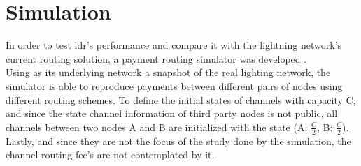 \section{Simulation}

In order to test \acrshort{ldr}'s performance and compare it with the lightning network's current routing solution, a payment routing simulator was developed \cite{simulator}. \\
Using as its underlying network a snapshot of the real lighting network, the simulator is able to reproduce payments between different pairs of nodes using different routing schemes. To define the initial states of channels with capacity C, and since the state channel information of third party nodes is not public, all channels between two nodes A and B are initialized with the state (A: $\frac{C}{2}$, B: $\frac{C}{2}$). Lastly, and since they are not the focus of the study done by the simulation, the channel routing fee's are not contemplated by it.\\

